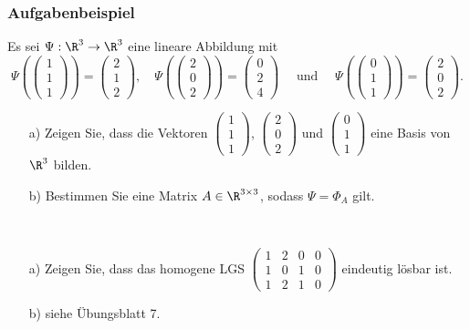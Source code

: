 \begin{frame}\frametitle{Aufgabenbeispiel}
Es sei $\Psi: \R^3 \to \R^3$ eine lineare Abbildung mit
$$
\Psi(\begin{pmatrix}1\\1\\1 \end{pmatrix}) = \begin{pmatrix}2 \\ 1 \\ 2 \end{pmatrix}, \quad \Psi(\begin{pmatrix} 2 \\ 0\\ 2 \end{pmatrix}) = \begin{pmatrix}0\\2\\4 \end{pmatrix} \quad \text{ und } \quad \Psi(\begin{pmatrix} 0\\1\\1\end{pmatrix} )= \begin{pmatrix} 2 \\ 0 \\ 2\end{pmatrix}.
$$
\begin{itemize}
\item[a)]  Zeigen Sie, dass die Vektoren $\begin{pmatrix}1\\1\\1 \end{pmatrix}$, $\begin{pmatrix} 2 \\ 0\\ 2 \end{pmatrix}$ und $\begin{pmatrix} 0\\1\\1\end{pmatrix}$ eine Basis von $\R^3$ bilden.
\item[b)] Bestimmen Sie eine Matrix $A \in \R^{3\times 3}$, sodass $\Psi=\Phi_A$ gilt. 
\end{itemize}\pause\vfill
{}\\
\begin{itemize}
\item[a)]Zeigen Sie, dass das homogene LGS $\left(\begin{array}{ccc|c}1&2&0&0\\1&0&1&0\\1&2&1&0 \end{array}\right)$ eindeutig lösbar ist.
\item[b)] siehe Übungsblatt 7.
\end{itemize}
\end{frame}
%
